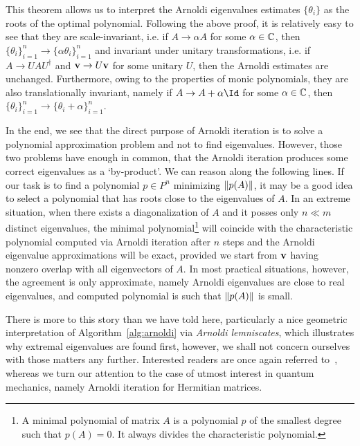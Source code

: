 This theorem allows us to interpret the Arnoldi eigenvalues estimates \(\{\theta_i\}\) as the roots of the optimal
polynomial. Following the above proof, it is relatively easy to see that they are scale-invariant, i.e.
if \(A\to\alpha A\) for some \(\alpha\in\mathbb{C}\), then \(\{\theta_i\}_{i=1}^n \to \{\alpha\theta_i\}_{i=1}^n\)
and invariant under unitary transformations, i.e. if \(A\to UAU^{\dagger}\) and \(\vectorbold{v}\to U\vectorbold{v}\) for
some unitary \(U\), then the Arnoldi estimates are unchanged. Furthermore, owing to the properties of monic polynomials,
they are also translationally invariant, namely if \(A\to A + \alpha \Id\) for some \(\alpha\in\mathbb{C}\), then
\(\{\theta_i\}_{i=1}^n \to \{\theta_i + \alpha\}_{i=1}^n\).

In the end, we see that the direct purpose of Arnoldi iteration is to solve a polynomial approximation problem
and not to find eigenvalues. However, those two problems have enough in common, that the Arnoldi iteration
produces some correct eigenvalues as a `by-product'. We can reason along the following lines. If our task
is to find a polynomial \(p\in P^n\) minimizing \(\norm{p(A)}\), it may be a good idea to select a polynomial
that has roots close to the eigenvalues of \(A\).  In an extreme situation, when there exists a diagonalization
of \(A\) and it posses only \(n\ll m\) distinct eigenvalues, the minimal polynomial\footnote{A minimal polynomial
	of matrix \(A\) is a polynomial \(p\) of the smallest degree such that \(p(A) = 0\). It always divides the
	characteristic polynomial.} will coincide with the characteristic polynomial computed via Arnoldi iteration
after \(n\) steps and the Arnoldi eigenvalue approximations will be exact,
provided we start from \(\vectorbold{v}\) having nonzero overlap with all eigenvectors of \(A\).
In most practical situations, however, the agreement is only approximate, namely Arnoldi eigenvalues are close to real
eigenvalues, and computed polynomial is such that \(\norm{p(A)}\) is small.

There is more to this story than we have told here, particularly a nice geometric interpretation
of Algorithm~\ref{alg:arnoldi} via \textit{Arnoldi lemniscates}, which illustrates why extremal eigenvalues
are found first, however, we shall not concern ourselves with those
matters any further. Interested readers are once again referred to~\textcite{Trefethen1997},
whereas we turn our attention to the case of utmost interest in quantum mechanics, namely Arnoldi iteration
for Hermitian matrices.

